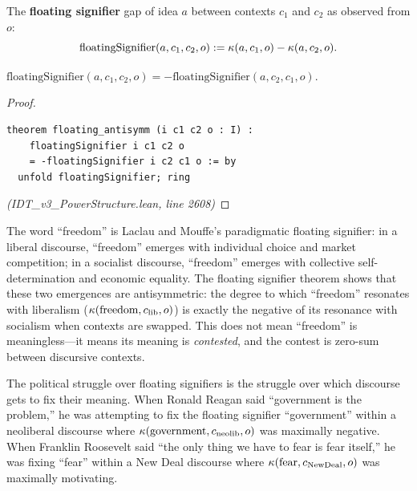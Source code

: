 \begin{definition}
\label{def:floating-signifier}
The \textbf{floating signifier} gap of idea $a$ between contexts $c_1$ and
$c_2$ as observed from $o$:
\[
  \mathrm{floatingSignifier}(a, c_1, c_2, o) := \kappa(a, c_1, o) - \kappa(a, c_2, o).
\]
\end{definition}

\begin{theorem}
\label{thm:floating-antisymm}
$\mathrm{floatingSignifier}(a, c_1, c_2, o) = -\mathrm{floatingSignifier}(a, c_2, c_1, o)$.
\end{theorem}

\begin{proof}
\begin{lstlisting}
theorem floating_antisymm (i c1 c2 o : I) :
    floatingSignifier i c1 c2 o
    = -floatingSignifier i c2 c1 o := by
  unfold floatingSignifier; ring
\end{lstlisting}
\textit{(IDT\_v3\_PowerStructure.lean, line 2608)}
\end{proof}

\begin{interpretation}
The word ``freedom'' is Laclau and Mouffe's paradigmatic floating signifier:
in a liberal discourse, ``freedom'' emerges with individual choice and market
competition; in a socialist discourse, ``freedom'' emerges with collective
self-determination and economic equality. The floating signifier theorem
shows that these two emergences are antisymmetric: the degree to which
``freedom'' resonates with liberalism ($\kappa(\text{freedom}, c_{\text{lib}}, o)$)
is exactly the negative of its resonance with socialism when contexts are
swapped. This does not mean ``freedom'' is meaningless---it means its meaning
is \emph{contested}, and the contest is zero-sum between discursive contexts.

The political struggle over floating signifiers is the struggle over which
discourse gets to fix their meaning. When Ronald Reagan said ``government is
the problem,'' he was attempting to fix the floating signifier ``government''
within a neoliberal discourse where $\kappa(\text{government}, c_{\text{neolib}}, o)$
was maximally negative. When Franklin Roosevelt said ``the only thing we have
to fear is fear itself,'' he was fixing ``fear'' within a New Deal discourse
where $\kappa(\text{fear}, c_{\text{NewDeal}}, o)$ was maximally motivating.
\end{interpretation}

